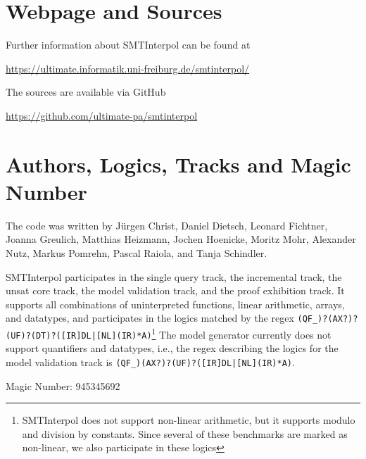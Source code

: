 \documentclass[a4paper]{easychair}
\newcommand\SI{SMTInterpol\xspace}
\begin{document}
\section*{Webpage and Sources}
Further information about \SI can be found at
\begin{center}
  \url{https://ultimate.informatik.uni-freiburg.de/smtinterpol/}
\end{center}
The sources are available via GitHub
\begin{center}
  \url{https://github.com/ultimate-pa/smtinterpol}
\end{center}

\section*{Authors, Logics, Tracks and Magic Number}
The code was written by J{\"u}rgen Christ, Daniel Dietsch, Leonard Fichtner, Joanna Greulich, Matthias Heizmann, Jochen Hoenicke, Moritz Mohr, Alexander Nutz, Markus Pomrehn, Pascal Raiola, and Tanja Schindler.

\SI participates in the single query track, the incremental track, the unsat core track, the model validation track, and the proof exhibition track.
It supports all combinations of uninterpreted functions, linear arithmetic, arrays, and datatypes, and participates in the logics matched by the regex
\verb!(QF_)?(AX?)?(UF)?(DT)?([IR]DL|[NL](IR)*A)!\footnote{\SI does not support non-linear arithmetic, but it supports modulo and division by constants.  Since several of these benchmarks are marked as non-linear, we also participate in these logics}
The model generator currently does not support quantifiers and datatypes, i.e.,
the regex describing the logics for the model validation track is
\verb!(QF_)(AX?)?(UF)?([IR]DL|[NL](IR)*A)!.


Magic Number: 945345692




\end{document}
